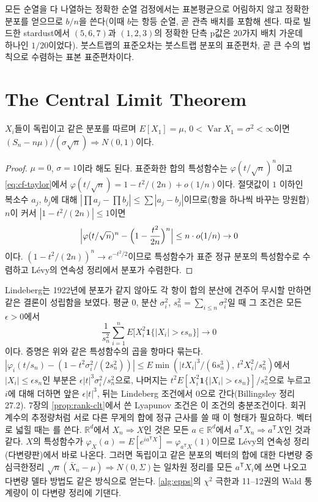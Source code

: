 모든 순열을 다 나열하는 정확한 순열 검정에서는 표본평균으로 어림하지 않고 정확한 분포를 얻으므로 $b/n$을 쓴다(이때 $b$는 항등 순열, 곧 관측 배치를 포함해 센다. 따로 빌드한 stardust에서 $(5,6,7)$과 $(1,2,3)$의 정확한 단측 p값은 $20$가지 배치 가운데 하나인 $1/20$이었다). 붓스트랩의 표준오차는 붓스트랩 분포의 표준편차, 곧 큰 수의 법칙으로 수렴하는 표본 표준편차이다.

\section{The Central Limit Theorem}
\label{sec:clt}

\begin{theorem}
\label{thm:clt}
$X_i$들이 독립이고 같은 분포를 따르며 $E[X_1]=\mu$, $0<\operatorname{Var}X_1=\sigma^2<\infty$이면 $(S_n-n\mu)/(\sigma\sqrt n)\Rightarrow N(0,1)$이다.
\end{theorem}

\begin{proof}
$\mu=0$, $\sigma=1$이라 해도 된다. 표준화한 합의 특성함수는 $\varphi(t/\sqrt n)^n$이고 \cref{eq:cf-taylor}에서 $\varphi(t/\sqrt n)=1-t^2/(2n)+o(1/n)$이다. 절댓값이 $1$ 이하인 복소수 $a_j$, $b_j$에 대해 $|\prod a_j-\prod b_j|\le\sum|a_j-b_j|$이므로(항을 하나씩 바꾸는 망원합) $n$이 커서 $|1-t^2/(2n)|\le1$이면
\[
\Bigl|\varphi(t/\sqrt n)^n-\Bigl(1-\frac{t^2}{2n}\Bigr)^n\Bigr|\le n\cdot o(1/n)\to0
\]
이다. $(1-t^2/(2n))^n\to e^{-t^2/2}$이므로 특성함수가 표준 정규 분포의 특성함수로 수렴하고 L\'evy의 연속성 정리에서 분포가 수렴한다.
\end{proof}

Lindeberg는 1922년에 분포가 같지 않아도 각 항이 합의 분산에 견주어 무시할 만하면 같은 결론이 성립함을 보였다\cite{lindeberg1922}. 평균 $0$, 분산 $\sigma_i^2$, $s_n^2=\sum_{i\le n}\sigma_i^2$일 때 그 조건은 모든 $\epsilon>0$에서
\[
\frac1{s_n^2}\sum_{i=1}^nE\bigl[X_i^2\mathbf 1\{|X_i|>\epsilon s_n\}\bigr]\to0
\]
이다. 증명은 위와 같은 특성함수의 곱을 항마다 묶는다. $|\varphi_i(t/s_n)-(1-t^2\sigma_i^2/(2s_n^2))|\le E\min(|tX_i|^3/(6s_n^3),\,t^2X_i^2/s_n^2)$에서 $|X_i|\le\epsilon s_n$인 부분은 $\epsilon|t|^3\sigma_i^2/s_n^2$으로, 나머지는 $t^2E[X_i^2\mathbf 1\{|X_i|>\epsilon s_n\}]/s_n^2$으로 누르고 $i$에 대해 더하면 앞은 $\epsilon|t|^3$, 뒤는 Lindeberg 조건에서 $0$으로 간다(Billingsley\cite{billingsley1995} 정리 27.2). 7장의 \cref{prop:rank-clt}에서 쓴 Lyapunov 조건은 이 조건의 충분조건이다. 회귀 계수의 추정량처럼 서로 다른 무게의 합에 정규 근사를 쓸 때 이 형태가 필요하다. 벡터로 넓힐 때는 를 쓴다. $\mathbb R^d$에서 $X_n\Rightarrow X$인 것은 모든 $a\in\mathbb R^d$에서 $a^{\mathsf T}X_n\Rightarrow a^{\mathsf T}X$인 것과 같다. $X$의 특성함수가 $\varphi_X(a)=E[e^{ia^{\mathsf T}X}]=\varphi_{a^{\mathsf T}X}(1)$이므로 L\'evy의 연속성 정리(다변량판)에서 바로 나온다. 그러면 독립이고 같은 분포의 벡터의 합에 대한 다변량 중심극한정리 $\sqrt n(\bar X_n-\mu)\Rightarrow N(0,\Sigma)$는 일차원 정리를 모든 $a^{\mathsf T}X_i$에 쓰면 나오고 다변량 델타 방법도 같은 방식으로 얻는다. \cref{alg:epps}의 $\chi^2$ 극한과 11--12권의 Wald 통계량이 이 다변량 정리에 기댄다.

